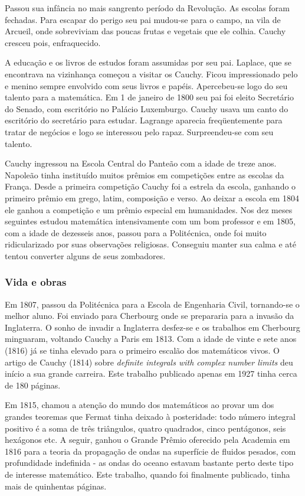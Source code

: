 Passou sua infância no mais sangrento período da Revolução. As escolas foram fechadas. Para escapar do perigo seu pai mudou-se para o campo, na vila de Arcueil, onde sobreviviam das poucas frutas e vegetais que ele colhia. Cauchy cresceu pois, enfraquecido.

A educação e os livros de estudos foram assumidas por seu pai. Laplace, que se encontrava na vizinhança começou a visitar os Cauchy. Ficou impressionado pelo e menino sempre envolvido com seus livros e papéis. Apercebeu-se logo do seu talento para a matemática. Em 1 de janeiro de 1800 seu pai foi eleito Secretário do Senado, com escritório no Palácio Luxemburgo. Cauchy usava um canto do escritório do secretário para estudar. Lagrange aparecia freqüentemente para tratar de negócios e logo se interessou pelo rapaz. Surpreendeu-se com seu talento.

Cauchy ingressou na Escola Central do Panteão com a idade de treze anos. Napoleão tinha instituído muitos prêmios em competições entre as escolas da França. Desde a primeira competição Cauchy foi a estrela da escola, ganhando o primeiro prêmio em grego, latim, composição e verso. Ao deixar a escola em 1804 ele ganhou a competição e um prêmio especial em humanidades. Nos dez meses seguintes estudou matemática intensivamente com um bom professor e em 1805, com a idade de dezesseis anos, passou para a Politécnica, onde foi muito ridicularizado por suas observações religiosas. Conseguiu manter sua calma e até tentou converter alguns de seus zombadores.

\subsubsection{Vida e obras}

Em 1807, passou da Politécnica para a Escola de Engenharia Civil, tornando-se o melhor aluno. Foi enviado para Cherbourg onde se prepararia para a invasão da Inglaterra. O sonho de invadir a Inglaterra desfez-se e os trabalhos em Cherbourg minguaram, voltando Cauchy a Paris em 1813. Com a idade de vinte e sete anos (1816) já se tinha elevado para o primeiro escalão dos matemáticos vivos. O artigo de Cauchy (1814) sobre \textit{definite integrals with complex number limits} deu início a sua grande carreira. Este trabalho publicado apenas em 1927 tinha cerca de 180 páginas.

Em 1815, chamou a atenção do mundo dos matemáticos ao provar um dos grandes teoremas que Fermat tinha deixado à posteridade: todo número integral positivo é a soma de três triângulos, quatro quadrados, cinco pentágonos, seis hexágonos etc. A seguir, ganhou o Grande Prêmio oferecido pela Academia em 1816 para a teoria da propagação de ondas na superfície de fluidos pesados, com profundidade indefinida - as ondas do oceano estavam bastante perto deste tipo de interesse matemático. Este trabalho, quando foi finalmente publicado, tinha mais de quinhentas páginas.

